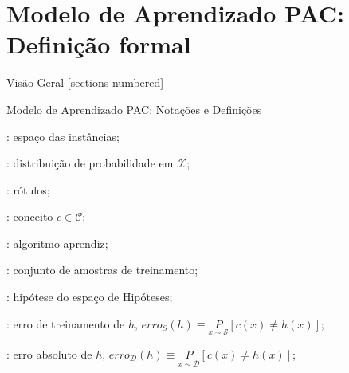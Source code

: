 \documentclass[10pt, professionalfonts]{beamer}
\begin{document}
{
\AtBeginSection{}
\section{Modelo de Aprendizado PAC: Definição formal}
\begin{frame}{Visão Geral}
  [sections numbered]
  \tableofcontents[hideallsubsections]
\end{frame}
\begin{frame}{Modelo de Aprendizado PAC: Notações e Definições}
  \begin{description}\setlength\itemsep{1em}
    \item [$\mathcal{X}$]: espaço das instâncias;
    \item [$\mathcal{D}$]: distribuição de probabilidade em $\mathcal{X}$;
    \item [$\mathcal{Y}=\{0,1\}$]: rótulos;
    \item [$c:\mathcal{X}\to\mathcal{Y}$]: conceito $c \in \mathcal{C}$;
    \item [$\mathcal{A}$]: algoritmo aprendiz;
    \item [$S=\{(x_i, c(x_i))\}$]: conjunto de amostras de treinamento;
    \item [$h \in \mathcal{H}$]: hipótese do espaço de Hipóteses;
    \item [$erro_{S}(h)$]: erro de treinamento de $h$, $erro_{S}(h) \equiv \underset{x \sim \mathcal{S}}{P}[c(x) \neq h(x)]$;
    \item [$erro_{\mathcal{D}}(h)$]: erro absoluto de $h$, $erro_{\mathcal{D}}(h) \equiv \underset{x \sim \mathcal{D}}{P}[c(x) \neq h(x)]$;
    
  \end{description}
\end{frame}


}
\end{document}

